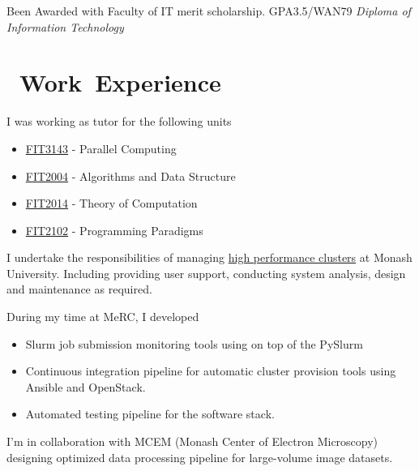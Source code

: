\documentclass{resume}
\begin{document}
Been Awarded with Faculty of IT merit scholarship. GPA3.5/WAN79
\textit{Diploma of Information Technology}

\section{\faUsers\ Work\ Experience}


I was working as tutor for the following units

\begin{itemize}
  \item \href{https://handbook.monash.edu/2022/units/FIT3143?year=2022}{FIT3143} - Parallel Computing
  \item \href{https://handbook.monash.edu/2022/units/FIT2004?year=2022}{FIT2004} - Algorithms and Data Structure
  \item \href{https://handbook.monash.edu/2022/units/FIT2014?year=2022}{FIT2014} - Theory of Computation
  \item \href{https://handbook.monash.edu/2021/units/FIT2102?year=2021}{FIT2102} - Programming Paradigms

\end{itemize}



I undertake the responsibilities of managing \href{https://www.monash.edu/researchinfrastructure/eresearch/capabilities/compute}{high performance clusters} at Monash University.
Including providing user support, conducting system analysis, design and maintenance as required.


During my time at MeRC, I developed
\begin{itemize}
  \item Slurm job submission monitoring tools using on top of the PySlurm
  \item Continuous integration pipeline for automatic cluster provision tools using Ansible and OpenStack.
  \item Automated testing pipeline for the software stack.
\end{itemize}

I'm in collaboration with MCEM (Monash Center of Electron Microscopy) designing optimized data processing pipeline for large-volume image datasets.
\end{document}
